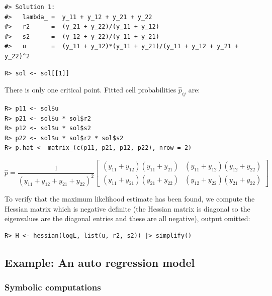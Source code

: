 \begin{verbatim}
#> Solution 1:
#>   lambda_ =  y_11 + y_12 + y_21 + y_22 
#>   r2      =  (y_21 + y_22)/(y_11 + y_12) 
#>   s2      =  (y_12 + y_22)/(y_11 + y_21) 
#>   u       =  (y_11 + y_12)*(y_11 + y_21)/(y_11 + y_12 + y_21 + y_22)^2
\end{verbatim}

\begin{verbatim}
R> sol <- sol[[1]]
\end{verbatim}

There is only one critical point. Fitted cell probabilities \(\hat p_{ij}\) are:

\begin{verbatim}
R> p11 <- sol$u
R> p21 <- sol$u * sol$r2
R> p12 <- sol$u * sol$s2
R> p22 <- sol$u * sol$r2 * sol$s2
R> p.hat <- matrix_(c(p11, p21, p12, p22), nrow = 2)
\end{verbatim}

\[
\hat p = \frac{1}{\left(y_{11} + y_{12} + y_{21} + y_{22}\right)^{2}}  \left[\begin{matrix}\left(y_{11} + y_{12}\right) \left(y_{11} + y_{21}\right) & \left(y_{11} + y_{12}\right) \left(y_{12} + y_{22}\right)\\\left(y_{11} + y_{21}\right) \left(y_{21} + y_{22}\right) & \left(y_{12} + y_{22}\right) \left(y_{21} + y_{22}\right)\end{matrix}\right]
\]

To verify that the maximum likelihood estimate has been found, we compute the Hessian matrix
which is negative definite (the Hessian matrix is diagonal so the eigenvalues are the diagonal entries and these are all negative), output omitted:

\begin{verbatim}
R> H <- hessian(logL, list(u, r2, s2)) |> simplify()
\end{verbatim}

\hypertarget{example-an-auto-regression-model}{%
\subsection{Example: An auto regression model}\label{example-an-auto-regression-model}}

\hypertarget{symbolic-computations}{%
\subsubsection{Symbolic computations}\label{symbolic-computations}}

